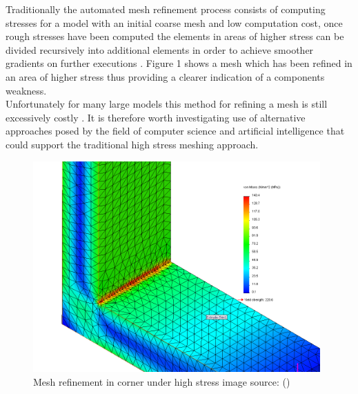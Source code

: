 \noindent
Traditionally the automated mesh refinement process consists of computing stresses for a model with an initial coarse mesh and low computation cost, once rough stresses have been computed the elements in areas of higher stress can be divided recursively into additional elements in order to achieve smoother gradients on further executions \cite{cite03}. Figure 1 shows a mesh which has been refined in an area of higher stress thus providing a clearer indication of a components weakness. \\ 

\noindent
Unfortunately for many large models this method for refining a mesh is still excessively costly \cite{DolsakPaper91}. It is therefore worth investigating use of alternative approaches posed by the field of computer science and artificial intelligence that could support the traditional high stress meshing approach. 

\begin{figure}[h!!]
  \centerline{\includegraphics[width=110mm, scale=0.5]{../Graphics/stressedCorner.png}}
  \caption{Mesh refinement in corner under high stress image source: (\cite{HighStressCorner})}
  \label{fig:boat1}
\end{figure}